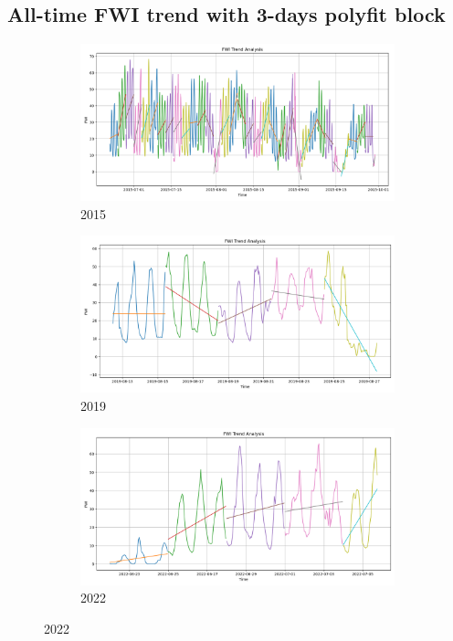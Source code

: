 \subsection{All-time FWI trend with 3-days polyfit block}
\begin{figure}[h]
	\centering
	\caption{All-time FWI polyfit trend}
	\begin{subfigure}{0.3\textwidth}
		\centering
		\includegraphics[width=\textwidth]{graphs/polyfit_trend_analysis/2015_BLOCK3days_FWI_trend_analysis.png}
		\caption{2015}
		\label{fig:2015_polyfit_fwi_alltime}
	\end{subfigure}
	\hfill
	\begin{subfigure}{0.3\textwidth}
		\centering
		\includegraphics[width=\textwidth]{graphs/polyfit_trend_analysis/2019_15days_BLOCK3days_FWI_trend_analysis.png}
		\caption{2019}
		\label{fig:2019_polyfit_fwi_alltime}
	\end{subfigure}
	\hfill
	\begin{subfigure}{0.3\textwidth}
		\centering
		\includegraphics[width=\textwidth]{graphs/polyfit_trend_analysis/2022_15days_BLOCK3days_FWI_trend_analysis.png}
		\caption{2022}
		\label{fig:2022_polyfit_fwi_alltime}
	\end{subfigure}
	
	\label{fig:fwi_polyfit_alltime}
\end{figure}

